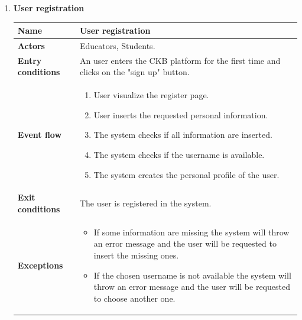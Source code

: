     \begin{enumerate}[label=\textbf{UC.\arabic*}]
        \item {} \textbf{User registration}
        \begin{table}[H]
    	    \centering
                \renewcommand{\arraystretch}{1.5}
                \begin{tabular}{|m{3.2cm}|m{9.8cm}|}
                    \hline
                    \textbf{Name} & User registration \\
                    \hline
                    \textbf{Actors} & Educators, Students. \\
                    \hline
                    \textbf{Entry conditions}  & An user enters the CKB platform for the first time and clicks on the "sign up" button. \\
                    \hline
                    \textbf{Event flow}  & 
                    \begin{enumerate}[label=\arabic*.]
                        \item User visualize the register page.
                        \item User inserts the requested personal information.
                        \item The system checks if all information are inserted.
                        \item The system checks if the username is available.
                        \item The system creates the personal profile of the user.
                    \end{enumerate}\\
                    \hline
                    \textbf{Exit conditions}  & The user is registered in the system. \\
                    \hline
                    \textbf{Exceptions}  & 
                    \begin{itemize}
                        \item If some information are missing the system will throw an error message and the user will be requested to insert the missing ones.
                        \item If the chosen username is not available the system will throw an error message and the user will be requested to choose another one.
                    \end{itemize} \\
                    \hline 
                \end{tabular}

\end{table}
\end{enumerate}
